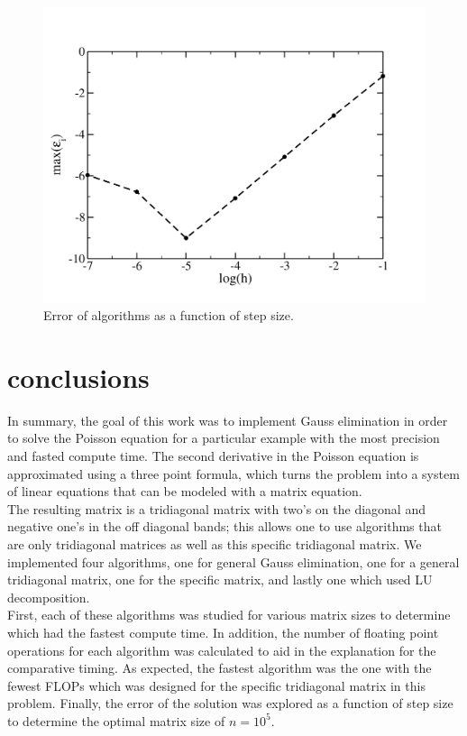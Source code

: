 \documentclass[prc,amsmath,twocolumn,superscriptaddress]{revtex4}
\begin{document}
\begin{figure}[b]
\includegraphics[scale=0.33]{error}
\caption{Error of algorithms as a function of step size.}
\label{err_fig}
\end{figure}

\section{conclusions}
\label{conc}
In summary, the goal of this work was to implement Gauss elimination in order to solve the Poisson equation for a particular example with the most precision and fasted compute time. The second derivative in the Poisson equation is approximated using a three point formula, which turns the problem into a system of linear equations that can be modeled with a matrix equation. \\

The resulting matrix is a tridiagonal matrix with two's on the diagonal and negative one's in the off diagonal bands; this allows one to use algorithms that are only tridiagonal matrices as well as this specific tridiagonal matrix. We implemented four algorithms, one for general Gauss elimination, one for a general tridiagonal matrix, one for the specific matrix, and lastly one which used LU decomposition. \\

First, each of these algorithms was studied for various matrix sizes to determine which had the fastest compute time. In addition, the number of floating point operations for each algorithm was calculated to aid in the explanation for the comparative timing. As expected, the fastest algorithm was the one with the fewest FLOPs which was designed for the specific tridiagonal matrix in this problem. Finally, the error of the solution was explored as a function of step size to determine the optimal matrix size of $n=10^5$. \\
\end{document}
